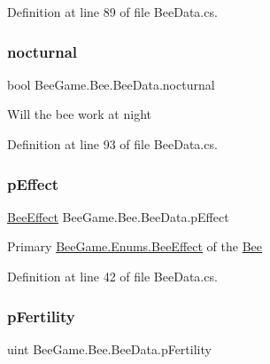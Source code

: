 Definition at line 89 of file Bee\+Data.\+cs.

\mbox{\label{struct_bee_game_1_1_bee_1_1_bee_data_a4cd90eee8d255726d982116f14b444b2}} 
\subsubsection{\texorpdfstring{nocturnal}{nocturnal}}
{\footnotesize\ttfamily bool Bee\+Game.\+Bee.\+Bee\+Data.\+nocturnal}



Will the bee work at night 



Definition at line 93 of file Bee\+Data.\+cs.

\mbox{\label{struct_bee_game_1_1_bee_1_1_bee_data_a652a963fb73f2a096a001d817c0ef2be}} 
\subsubsection{\texorpdfstring{p\+Effect}{pEffect}}
{\footnotesize\ttfamily \hyperlink{namespace_bee_game_1_1_enums_acf7ae32a86385a40fc0c7b55af95c6c3}{Bee\+Effect} Bee\+Game.\+Bee.\+Bee\+Data.\+p\+Effect}



Primary \hyperlink{namespace_bee_game_1_1_enums_acf7ae32a86385a40fc0c7b55af95c6c3}{Bee\+Game.\+Enums.\+Bee\+Effect} of the \hyperlink{namespace_bee_game_1_1_bee}{Bee} 



Definition at line 42 of file Bee\+Data.\+cs.

\mbox{\label{struct_bee_game_1_1_bee_1_1_bee_data_a12b5a0d54c6c9162a69a88c349b044d1}} 
\subsubsection{\texorpdfstring{p\+Fertility}{pFertility}}
{\footnotesize\ttfamily uint Bee\+Game.\+Bee.\+Bee\+Data.\+p\+Fertility}



